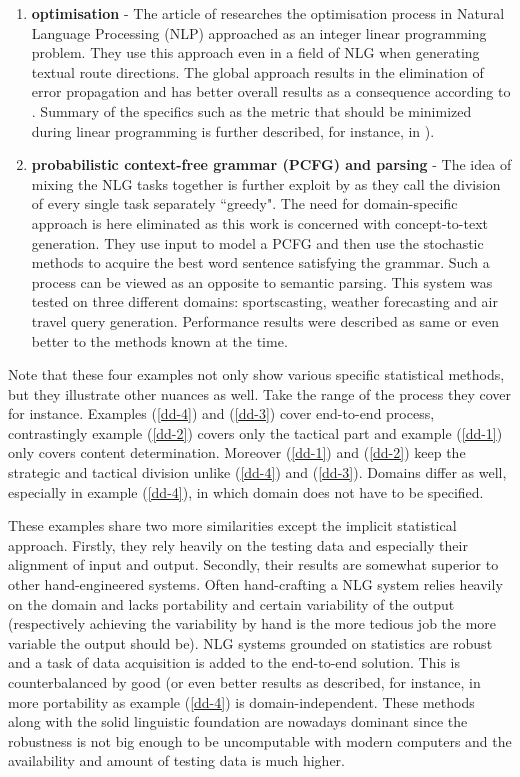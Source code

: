 \begin{enumerate}
	\item \textbf{optimisation} - The article of \cite{marciniak2005beyond} researches the optimisation process in Natural Language Processing (NLP) approached as an integer linear programming problem. They use this approach even in a field of NLG when generating textual route directions. The global approach results in the elimination of error propagation and has better overall results as a consequence according to \cite{marciniak2005beyond}. Summary of the specifics such as the metric that should be minimized during linear programming is further described, for instance, in \cite{gatt2018survey}).\label{dd-3}
	\item \textbf{probabilistic context-free grammar (PCFG) and parsing} - The idea of mixing the NLG tasks together is further exploit by \cite{konstas2013global} as they call the division of every single task separately ``greedy". The need for domain-specific approach is here eliminated as this work is concerned with concept-to-text generation. They use input to model a PCFG and then use the stochastic methods to acquire the best word sentence satisfying the grammar. Such a process can be viewed as an opposite to semantic parsing. This system was tested on three different domains: sportscasting, weather forecasting and air travel query generation. Performance results were described as same or even better to the methods known at the time.\label{dd-4}
\end{enumerate}
Note that these four examples not only show various specific statistical methods, but they illustrate other nuances as well. Take the range of the process they cover for instance. Examples (\ref{dd-4}) and (\ref{dd-3}) cover end-to-end process, contrastingly example (\ref{dd-2}) covers only the tactical part and example (\ref{dd-1}) only covers content determination. Moreover (\ref{dd-1}) and (\ref{dd-2}) keep the strategic and tactical division unlike (\ref{dd-4}) and (\ref{dd-3}). Domains differ as well, especially in example (\ref{dd-4}), in which domain does not have to be specified.

These examples share two more similarities except the implicit statistical approach. Firstly, they rely heavily on the testing data and especially their alignment of input and output. Secondly, their results are somewhat superior to other hand-engineered systems. Often hand-crafting a NLG system relies heavily on the domain and lacks portability and certain variability of the output (respectively achieving the variability by hand is the more tedious job the more variable the output should be). NLG systems grounded on statistics are robust and a task of data acquisition is added to the end-to-end solution. This is counterbalanced by good (or even better results as described, for instance, in \citet{konstas2013global} more portability as example (\ref{dd-4}) is domain-independent. These methods along with the solid linguistic foundation are nowadays dominant \citep{gatt2018survey} since the robustness is not big enough to be uncomputable with modern computers and the availability  and amount of testing data is much higher. 